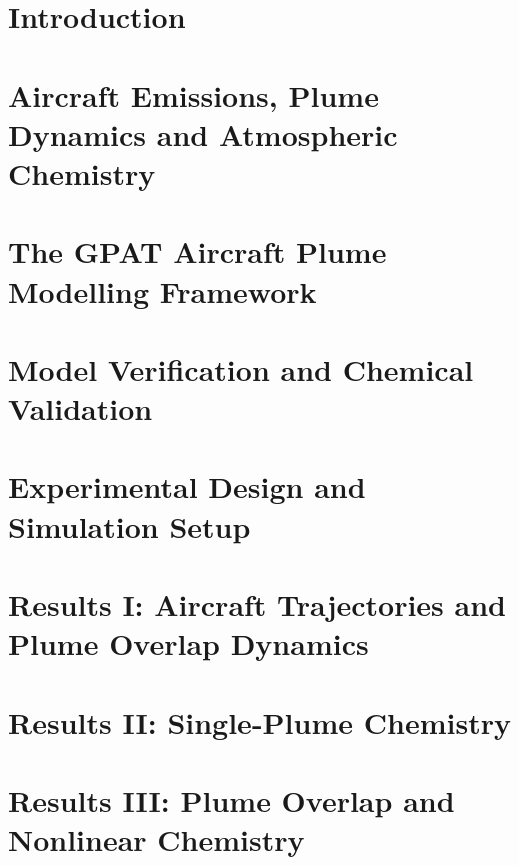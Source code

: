\documentclass[
  ieee        %
]{uob-thesis}
\begin{document}
\tableofcontents
\listoftables
\listoffigures



\mainmatter

\chapter{Introduction}
\label{chapter1}


\chapter{Aircraft Emissions, Plume Dynamics and Atmospheric Chemistry}
\label{chapter2}


\chapter{The GPAT Aircraft Plume Modelling Framework} 
\label{chapter3}
% 

\chapter{Model Verification and Chemical Validation}
\label{chapter4}
%

\chapter{Experimental Design and Simulation Setup}
\label{chapter5}
% 

\chapter{Results I: Aircraft Trajectories and Plume Overlap Dynamics}
\label{chapter6}
% 

\chapter{Results II: Single-Plume Chemistry}
\label{chapter7}
% 

\chapter{Results III: Plume Overlap and Nonlinear Chemistry}
\label{chapter8}
% 
\end{document}
